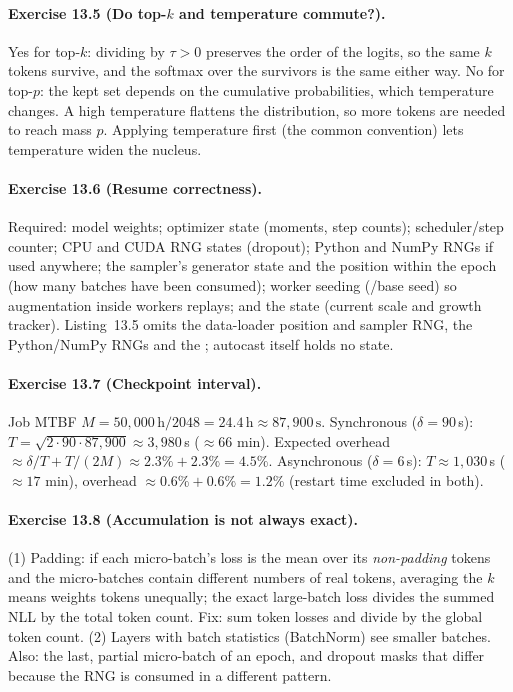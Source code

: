 \paragraph{Exercise 13.5 (Do top-$k$ and temperature commute?).}
Yes for top-$k$: dividing by $\tau>0$ preserves the order of the logits, so the same $k$ tokens
survive, and the softmax over the survivors is the same either way. No for top-$p$: the kept set
depends on the cumulative probabilities, which temperature changes. A high temperature flattens
the distribution, so more tokens are needed to reach mass $p$. Applying temperature first (the
common convention) lets temperature widen the nucleus.

\paragraph{Exercise 13.6 (Resume correctness).}
Required: model weights; optimizer state (moments, step counts); scheduler/step counter; CPU and
CUDA RNG states (dropout); Python  and NumPy RNGs if used anywhere; the sampler's
generator state and the position within the epoch (how many batches have been consumed); worker
seeding (/base seed) so augmentation inside workers replays; and the
 state (current scale and growth tracker). Listing~13.5 omits the data-loader
position and sampler RNG, the Python/NumPy RNGs and the ; autocast itself holds
no state.

\paragraph{Exercise 13.7 (Checkpoint interval).}
Job MTBF $M=50{,}000\,\text{h}/2048=24.4\,\text{h}\approx87{,}900\,\text{s}$.
Synchronous ($\delta=90$\,s): $T=\sqrt{2\cdot90\cdot87{,}900}\approx3{,}980$\,s ($\approx66$ min).
Expected overhead $\approx\delta/T+T/(2M)\approx2.3\%+2.3\%=4.5\%$.
Asynchronous ($\delta=6$\,s): $T\approx1{,}030$\,s ($\approx17$ min), overhead
$\approx0.6\%+0.6\%=1.2\%$ (restart time excluded in both).

\paragraph{Exercise 13.8 (Accumulation is not always exact).}
(1) Padding: if each micro-batch's loss is the mean over its \emph{non-padding} tokens and the
micro-batches contain different numbers of real tokens, averaging the $k$ means weights tokens
unequally; the exact large-batch loss divides the summed NLL by the total token count. Fix: sum
token losses and divide by the global token count. (2) Layers with batch statistics (BatchNorm)
see smaller batches. Also: the last, partial micro-batch of an epoch, and dropout masks that
differ because the RNG is consumed in a different pattern.

